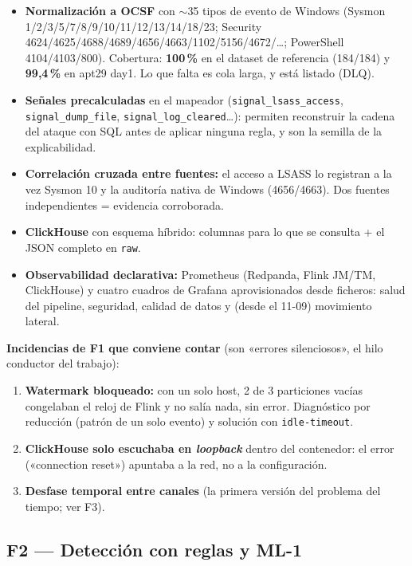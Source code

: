 \documentclass[11pt,a4paper]{article}
\newcommand{\cod}[1]{\texttt{#1}}
\begin{document}
\begin{itemize}
  \item \textbf{Normalización a OCSF} con $\sim$35 tipos de evento de Windows (Sysmon 1/2/3/5/7/8/9/10/11/12/13/14/18/23;
        Security 4624/4625/4688/4689/4656/4663/1102/5156/4672/\ldots; PowerShell 4104/4103/800).
        Cobertura: \textbf{100\,\%} en el dataset de referencia (184/184) y \textbf{99,4\,\%} en apt29 day1.
        Lo que falta es cola larga, y está listado (DLQ).
  \item \textbf{Señales precalculadas} en el mapeador (\cod{signal\_lsass\_access}, \cod{signal\_dump\_file},
        \cod{signal\_log\_cleared}\ldots): permiten reconstruir la cadena del ataque con SQL antes de
        aplicar ninguna regla, y son la semilla de la explicabilidad.
  \item \textbf{Correlación cruzada entre fuentes:} el acceso a LSASS lo registran a la vez Sysmon 10 y la
        auditoría nativa de Windows (4656/4663). Dos fuentes independientes = evidencia corroborada.
  \item \textbf{ClickHouse} con esquema híbrido: columnas para lo que se consulta + el JSON completo en \cod{raw}.
  \item \textbf{Observabilidad declarativa:} Prometheus (Redpanda, Flink JM/TM, ClickHouse) y cuatro cuadros
        de Grafana aprovisionados desde ficheros: salud del pipeline, seguridad, calidad de datos y
        (desde el 11-09) movimiento lateral.
\end{itemize}

\textbf{Incidencias de F1 que conviene contar} (son «errores silenciosos», el hilo conductor del trabajo):
\begin{enumerate}
  \item \textbf{Watermark bloqueado:} con un solo host, 2 de 3 particiones vacías congelaban el reloj de
        Flink y no salía nada, sin error. Diagnóstico por reducción (patrón de un solo evento) y solución
        con \cod{idle-timeout}.
  \item \textbf{ClickHouse solo escuchaba en \textit{loopback}} dentro del contenedor: el error («connection reset»)
        apuntaba a la red, no a la configuración.
  \item \textbf{Desfase temporal entre canales} (la primera versión del problema del tiempo; ver F3).
\end{enumerate}

\subsection{F2 — Detección con reglas y ML-1}\label{sec:f2}
\end{document}
